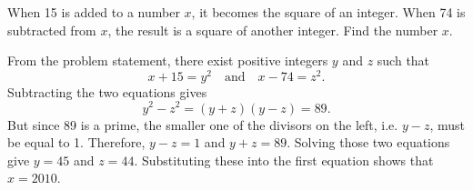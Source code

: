 \begin{question}
    When 15 is added to a number $x$, it becomes the square of an integer. When
    74 is subtracted from $x$, the result is a square of another integer. Find
    the number $x$. 
\end{question}
\begin{solution}
    From the problem statement, there exist positive integers $y$ and $z$ such
    that
    \[ x + 15 = y^2 \quad \text{and} \quad x - 74 = z^2. \]
    Subtracting the two equations gives
    \[ y^2 - z^2 = (y + z)(y - z) = 89. \]
    But since 89 is a prime, the smaller one of the divisors on the left, i.e.
    $y - z$, must be equal to 1. Therefore, $y - z = 1$ and $y + z = 89$.
    Solving those two equations give $y = 45$ and $z = 44$. Substituting these
    into the first equation shows that $x = 2010$.
\end{solution}

